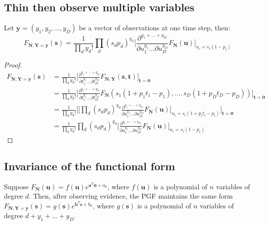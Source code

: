 \documentclass{article}
\begin{document}
\subsection{Thin then observe multiple variables}
Let $\mathbf{y} = (y_1, y_2, \ldots, y_D)$ be a vector of observations at one time step, then:
$$F_{\mathbf{N}, \mathbf{Y} = \mathbf{y}}(\mathbf{s}) = \frac{1}{\prod_d y_d!} \prod_d (s_dp_d)^{y_d} \bigg [\frac{\partial^{y_1+\ldots+y_D}}{\partial u_1^{y_1} \ldots \partial u_D^{y_D}} F_{\mathbf{N}}(\mathbf{u}) \bigg]_{u_i = s_i(1-p_i)}$$

\begin{proof}
\begin{align*}
F_{\mathbf{N}, \mathbf{Y} = \mathbf{y}}(\mathbf{s})
&= \frac{1}{\prod_d y_d!} \bigg[\frac{\partial^{y_1+\ldots+y_D}}{\partial t_1^{y_1} \ldots \partial t_D^{y_D}} F_{\mathbf{N}, \mathbf{Y}}(\mathbf{s}, \mathbf{t}) \bigg]_{\mathbf{t} = \mathbf{0}} \\
&= \frac{1}{\prod_d y_d!} \bigg[\frac{\partial^{y_1+\ldots+y_D}}{\partial t_1^{y_1} \ldots \partial t_D^{y_D}} F_{\mathbf{N}}(s_1(1+p_1t_1-p_1), \ldots, s_D(1+p_Dt_D-p_D)) \bigg]_{\mathbf{t} = \mathbf{0}} \\
&= \frac{1}{\prod_d y_d!} \bigg[ \bigg[ \prod_d (s_dp_d)^{y_d} \frac{\partial^{y_1+\ldots+y_D}}{\partial u_1^{y_1} \ldots \partial u_D^{y_D}} F_{\mathbf{N}}(\mathbf{u}) \bigg]_{u_i = s_i(1+p_it_i-p_i)} \bigg]_{\mathbf{t} = \mathbf{0}} \\
&= \frac{1}{\prod_d y_d!} \prod_d (s_dp_d)^{y_d} \bigg[ \frac{\partial^{y_1+\ldots+y_D}}{\partial u_1^{y_1} \ldots \partial u_D^{y_D}} F_{\mathbf{N}}(\mathbf{u}) \bigg]_{u_i = s_i(1-p_i)}
\end{align*}
\end{proof}

\subsection{Invariance of the functional form}
Suppose $F_\mathbf{N}(\mathbf{u}) = f(\mathbf{u}) e^{\mathbf{a}^T \mathbf{u} + a_0}$, where $f(\mathbf{u})$ is a polynomial of $n$ variables of degree $d$. Then, after observing evidence, the PGF maintains the same form $F_{\mathbf{N}, \mathbf{Y} = \mathbf{y}}(\mathbf{s}) = g(\mathbf{s}) e^{\mathbf{b}^T \mathbf{s} + b_0}$, where $g(\mathbf{s})$ is a polynomial of $n$ variables of degree $d + y_1 + \ldots + y_D$.
\end{document}
